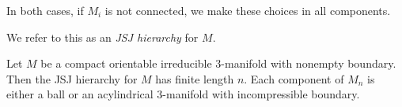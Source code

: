 In both cases, if $M_i$ is not connected, we make these choices in all
components.

\begin{defn}

We refer to this as an \emph{JSJ hierarchy} for $M$.

\end{defn}

\begin{lemma}

Let $M$ be a compact orientable irreducible $3$-manifold with nonempty
boundary.  Then the JSJ hierarchy for $M$ has finite length $n$. Each
component of $M_n$ is either a ball or an acylindrical $3$-manifold with
incompressible boundary.

\end{lemma}

